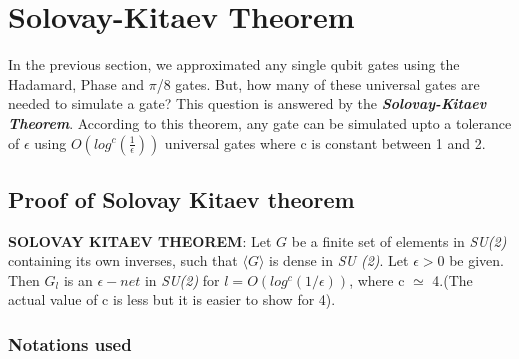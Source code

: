 \section{Solovay-Kitaev Theorem}
In the previous section, we approximated any single qubit gates using the Hadamard, Phase and $\pi$/8 gates. But, how many of these universal gates are needed to simulate a gate? This question is answered by the \textbf{\textit{Solovay-Kitaev Theorem}}. According to this theorem, any gate can be simulated upto a tolerance of $\epsilon$ using $O(log^c(\frac{1}{\epsilon}))$ universal gates where c is constant between 1 and 2.\\
\subsection{Proof of Solovay Kitaev theorem}
\textbf{SOLOVAY KITAEV THEOREM}: Let ${G}$ be a finite set of elements in \textit{SU(2)} containing its own inverses, such that $\langle G\rangle$ is dense in \textit{SU (2)}. Let $\epsilon > 0$ be given. Then ${G_l}$ is an $\epsilon-net$ in \textit{SU(2)} for ${l} = O(log^c (1/\epsilon))$, where c $\simeq$ 4.(The actual value of c is less but it is easier to show for 4).
\subsubsection{Notations used}

